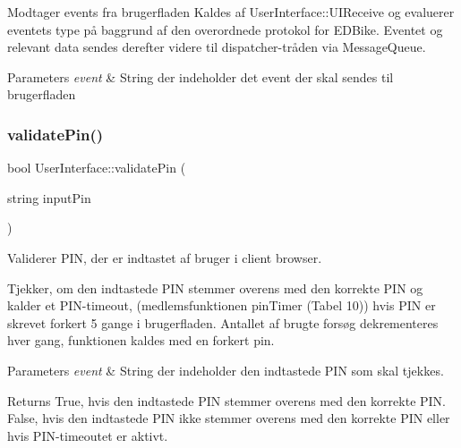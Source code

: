 Modtager events fra brugerfladen Kaldes af User\+Interface\+::\+U\+I\+Receive og evaluerer eventets type på baggrund af den overordnede protokol for E\+D\+Bike. Eventet og relevant data sendes derefter videre til dispatcher-\/tråden via Message\+Queue. 


\begin{DoxyParams}{Parameters}
{\em event} & String der indeholder det event der skal sendes til brugerfladen \\
\hline
\end{DoxyParams}
\mbox{\label{classUserInterface_a899642cb1d73de5804ac8b56d92ca94c}} 
\subsubsection{\texorpdfstring{validate\+Pin()}{validatePin()}}
{\footnotesize\ttfamily bool User\+Interface\+::validate\+Pin (\begin{DoxyParamCaption}\item[{string}]{input\+Pin }\end{DoxyParamCaption})}



Validerer P\+IN, der er indtastet af bruger i client browser. 

Tjekker, om den indtastede P\+IN stemmer overens med den korrekte P\+IN og kalder et P\+I\+N-\/timeout, (medlemsfunktionen pin\+Timer (Tabel 10)) hvis P\+IN er skrevet forkert 5 gange i brugerfladen. Antallet af brugte forsøg dekrementeres hver gang, funktionen kaldes med en forkert pin. 
\begin{DoxyParams}{Parameters}
{\em event} & String der indeholder den indtastede P\+IN som skal tjekkes. \\
\hline
\end{DoxyParams}
\begin{DoxyReturn}{Returns}
True, hvis den indtastede P\+IN stemmer overens med den korrekte P\+IN. False, hvis den indtastede P\+IN ikke stemmer overens med den korrekte P\+IN eller hvis P\+I\+N-\/timeoutet er aktivt. 
\end{DoxyReturn}
\mbox{\label{classUserInterface_a569c725b82d4ba420574f072e0bfc866}} 
